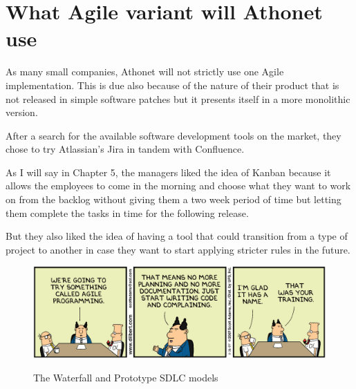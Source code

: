 \section{What Agile variant will Athonet use}

	As many small companies, Athonet will not strictly use one Agile implementation.
	This is due also because of the nature of their product that is not released in simple software patches but it presents itself in a more monolithic version.
	
	After a search for the available software development tools on the market, they chose to try Atlassian's Jira in tandem with Confluence.
	
	As I will say in Chapter 5, the managers liked the idea of Kanban because it allows the employees to come in the morning and choose what they want to work on from the backlog without giving them a two week period of time but letting them complete the tasks in time for the following release.
	
	But they also liked the idea of having a tool that could transition from a type of project to another in case they want to start applying stricter rules in the future.
	
	\begin{figure}[H]
		\centering
		\includegraphics[width=\textwidth]{resources/Dilbert_Training_Agile_Programming}\\
		\caption{The Waterfall and Prototype SDLC models}
	\end{figure}

